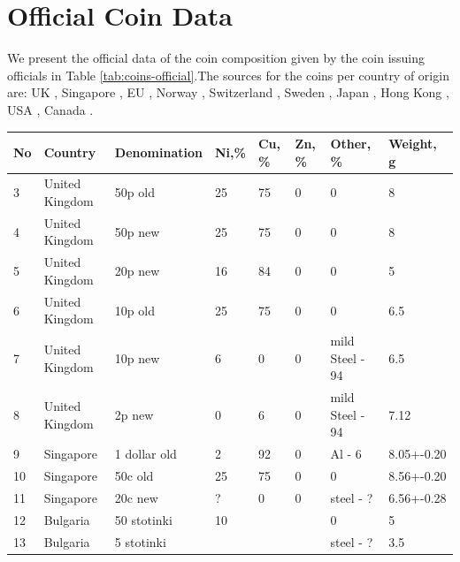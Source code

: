 \documentclass[11pt,a4paper,twoside,onecolumn]{article}
\begin{document}
\section{Official Coin Data}
We present the official data of the coin composition given by the coin issuing officials in Table \ref{tab:coins-official}.The sources for the coins per country of origin are: UK \cite{RoyalMint}, Singapore \cite{SingaporeOld,SingaporeNew}, EU \cite{2014EUCoins}, Norway \cite{1997NorwayKrone}, Switzerland \cite{SwissCentime}, Sweden \cite{SwedenKrona}, Japan \cite{JapanYen}, Hong Kong \cite{HongKongCent}, USA \cite{USACoins}, Canada \cite{CanadaCoin}.

\begin{table}[htbp]
    \centering
    \begin{tabular}{@{}llllllll@{}}
        \toprule
        No & Country        & Denomination   & Ni,\%    & Cu, \%   & Zn, \% & Other, \%       & Weight, g  \\ \midrule        
        3  & United Kingdom & 50p old        & 25       & 75       & 0      & 0               & 8          \\
        4  & United Kingdom & 50p new        & 25       & 75       & 0      & 0               & 8          \\
        5  & United Kingdom & 20p new        & 16       & 84       & 0      & 0               & 5          \\
        6  & United Kingdom & 10p old        & 25       & 75       & 0      & 0               & 6.5        \\
        7  & United Kingdom & 10p new        & 6        & 0        & 0      & mild Steel - 94 & 6.5        \\
        8  & United Kingdom & 2p new         & 0        & 6        & 0      & mild Steel - 94 & 7.12        \\
        9  & Singapore      & 1 dollar old   & 2        & 92       & 0      & Al - 6          & 8.05+-0.20 \\
        10 & Singapore      & 50c old        & 25       & 75       & 0      & 0               & 8.56+-0.20 \\
        11 & Singapore      & 20c new        & ?        & 0        & 0      & steel - ?       & 6.56+-0.28 \\
        12 & Bulgaria       & 50 stotinki    & 10       &          &        & 0               & 5          \\
        13 & Bulgaria       & 5 stotinki     &          &          &        & steel - ?       & 3.5        \\

\end{tabular}
\end{table}
\end{document}
